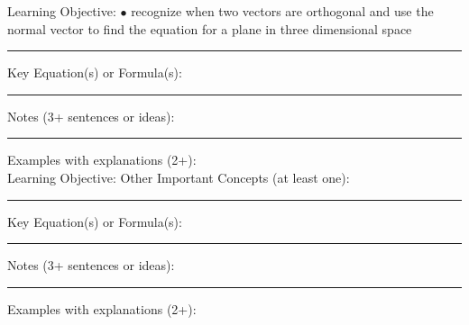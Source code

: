 \documentclass{article}
\theoremstyle{plain}
\theoremstyle{definition}
\theoremstyle{remark}
\begin{document}
\newpage
\noindent \large Learning Objective:
\normalsize
\vskip0.15in
\indent $\bullet$ recognize when two vectors are orthogonal and use the normal vector to find the equation for a plane in three dimensional space
\vskip0.15in
\hrule
\vspace{0.1in}
\large \noindent Key Equation(s) or Formula(s):
\normalsize

\vspace{1in}
\hrule
\vspace{0.1in}
\large \noindent Notes (3+ sentences or ideas):
\normalsize
\vspace{1.75in}
\hrule
\vspace{0.1in}

\large \noindent Examples with explanations (2+):\\



\newpage
\noindent \large Learning Objective:
\normalsize
\vskip0.1in
\noindent Other Important Concepts (at least one):
\vspace{0.75in}
\hrule
\vspace{0.1in}
\large \noindent Key Equation(s) or Formula(s):
\normalsize

\vspace{1.25in}
\hrule
\vspace{0.1in}
\large \noindent Notes (3+ sentences or ideas):
\normalsize
\vspace{1.75in}
\hrule
\vspace{0.1in}

\large \noindent Examples with explanations (2+):
\end{document}
